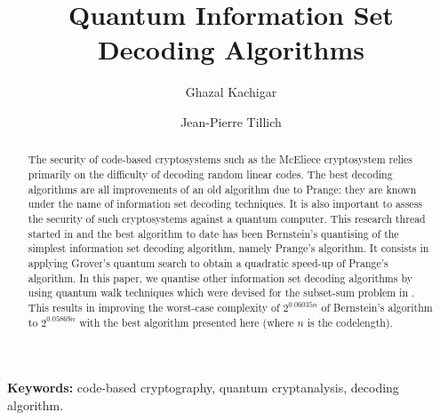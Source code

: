 \documentclass[runningheads]{llncs}
\begin{document}
\title{Quantum Information Set Decoding Algorithms}
\author{Ghazal Kachigar   \and Jean-Pierre Tillich }


\maketitle


\begin{abstract}
The security of code-based cryptosystems such as the McEliece cryptosystem relies primarily on the difficulty of decoding random linear codes. 
The best decoding algorithms are all improvements of an old algorithm due to Prange:  they are known under the name of  information set decoding techniques.
It is also important to assess the security of such cryptosystems against a quantum computer. This research thread started in \cite{OS09} and the
best algorithm to date has been Bernstein's quantising \cite{B10} of the simplest information set decoding algorithm, namely Prange's algorithm.
It consists in applying Grover's quantum search  to obtain a quadratic speed-up of Prange's algorithm.
In this paper, we quantise other information set decoding 
algorithms by using quantum walk techniques which were devised for the subset-sum problem in \cite{BJLM13}.
This results in improving the worst-case complexity of $2^{0.06035n}$ of Bernstein's algorithm to
$2^{0.05869n}$ with the best algorithm presented here (where $n$ is the codelength).
\end{abstract}

\textbf{Keywords:} code-based cryptography, quantum cryptanalysis, decoding algorithm.










\newpage

\end{document}
